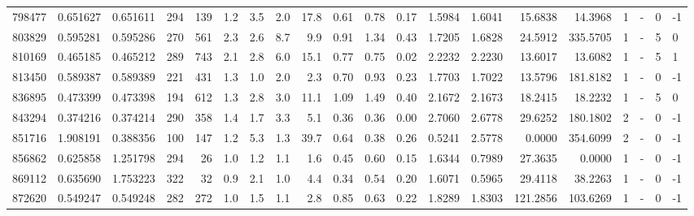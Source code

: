 \begin{tabular}{rrrrrrrrrrrrrrrrrlrl}
    798477 & 0.651627 &   0.651611 &  294 &  139 &      1.2 &      3.5 &     2.0 &     17.8 &       0.61 &        0.78 &        0.17 &  1.5984 &  1.6041 &   15.6838 &   14.3968 &       1 &             - &        0 &        -1 \\
    803829 & 0.595281 &   0.595286 &  270 &  561 &      2.3 &      2.6 &     8.7 &      9.9 &       0.91 &        1.34 &        0.43 &  1.7205 &  1.6828 &   24.5912 &  335.5705 &       1 &             - &        5 &         0 \\
    810169 & 0.465185 &   0.465212 &  289 &  743 &      2.1 &      2.8 &     6.0 &     15.1 &       0.77 &        0.75 &        0.02 &  2.2232 &  2.2230 &   13.6017 &   13.6082 &       1 &             - &        5 &         1 \\
    813450 & 0.589387 &   0.589389 &  221 &  431 &      1.3 &      1.0 &     2.0 &      2.3 &       0.70 &        0.93 &        0.23 &  1.7703 &  1.7022 &   13.5796 &  181.8182 &       1 &             - &        0 &        -1 \\
    836895 & 0.473399 &   0.473398 &  194 &  612 &      1.3 &      2.8 &     3.0 &     11.1 &       1.09 &        1.49 &        0.40 &  2.1672 &  2.1673 &   18.2415 &   18.2232 &       1 &             - &        5 &         0 \\
    843294 & 0.374216 &   0.374214 &  290 &  358 &      1.4 &      1.7 &     3.3 &      5.1 &       0.36 &        0.36 &        0.00 &  2.7060 &  2.6778 &   29.6252 &  180.1802 &       2 &             - &        0 &        -1 \\
    851716 & 1.908191 &   0.388356 &  100 &  147 &      1.2 &      5.3 &     1.3 &     39.7 &       0.64 &        0.38 &        0.26 &  0.5241 &  2.5778 &    0.0000 &  354.6099 &       2 &             - &        0 &        -1 \\
    856862 & 0.625858 &   1.251798 &  294 &   26 &      1.0 &      1.2 &     1.1 &      1.6 &       0.45 &        0.60 &        0.15 &  1.6344 &  0.7989 &   27.3635 &    0.0000 &       1 &             - &        0 &        -1 \\
    869112 & 0.635690 &   1.753223 &  322 &   32 &      0.9 &      2.1 &     1.0 &      4.4 &       0.34 &        0.54 &        0.20 &  1.6071 &  0.5965 &   29.4118 &   38.2263 &       1 &             - &        0 &        -1 \\
    872620 & 0.549247 &   0.549248 &  282 &  272 &      1.0 &      1.5 &     1.1 &      2.8 &       0.85 &        0.63 &        0.22 &  1.8289 &  1.8303 &  121.2856 &  103.6269 &       1 &             - &        0 &        -1 \\

\end{tabular}
